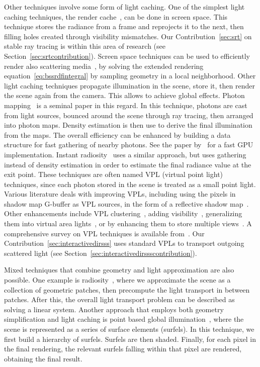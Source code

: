 Other techniques involve some form of light caching. One of the simplest light caching techniques, the render cache~\cite{Walter2002}, can be done in screen space. This technique stores the radiance from a frame and reprojects it to the next, then filling holes created through visibility mismatches. Our Contribution~\ref{sec:srt} on stable ray tracing is within this area of research (see Section~\ref{sec:srtcontribution}). Screen space techniques can be used to efficiently render also scattering media~\cite{Nalbach2014}, by solving the extended rendering equation~\ref{eq:bssrdfintegral} by sampling geometry in a local neighborhood. Other light caching techniques propagate illumination in the scene, store it, then render the scene again from the camera. This allows to achieve global effects. Photon mapping~\cite{Jensen1996} is a seminal paper in this regard. In this technique, photons are cast from light sources, bounced around the scene through ray tracing, then arranged into photon maps. Density estimation is then use to derive the final illumination from the maps. The overall efficiency can be enhanced by building a data structure for fast gathering of nearby photons. See the paper by~\citet{Mara2013} for a fast GPU implementation. Instant radiosity~\cite{Keller1997} uses a similar approach, but uses gathering instead of density estimation in order to estimate the final radiance value at the exit point. These techniques are often named VPL (virtual point light) techniques, since each photon stored in the scene is treated as a small point light. Various literature deals with improving VPLs, including using the pixels in shadow map G-buffer as VPL sources, in the form of a reflective shadow map~\cite{Frisvad2005,Dachsbacher2005}. Other enhancements include VPL clustering~\cite{Walter2005, Bus2015}, adding visibility~\cite{Ritschel2008}, generalizing them into virtual area lights~\cite{Dong09}, or by enhancing them to store multiple views~\cite{Simon2015}. A comprehensive survey on VPL techniques is available from~\citet{Dachsbacher2014}. Our Contribution~\ref{sec:interactivedirsss} uses standard VPLs to transport outgoing scattered light (see Section~\ref{sec:interactivedirssscontribution}).

Mixed techniques that combine geometry and light approximation are also possible. One example is radiosity~\cite{Goral1984}, where we approximate the scene as a collection of geometric patches, then precompute the light transport in between patches. After this, the overall light transport problem can be described as solving a linear system. Another approach that employs both geometry simplification and light caching is point based global illumination~\cite{Bunnel2005, Christensen2008}, where the scene is represented as a series of surface elements (surfels). In this technique, we first build a hierarchy of surfels. Surfels are then shaded. Finally, for each pixel in the final rendering, the relevant surfels falling within that pixel are rendered, obtaining the final result. 

